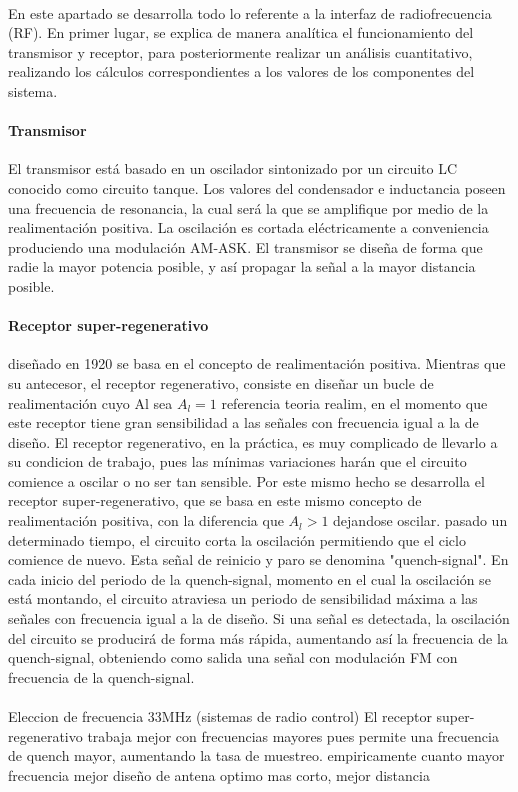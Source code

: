 \paragraph{} En este apartado se desarrolla todo lo referente a la interfaz de radiofrecuencia (RF). En primer lugar, se explica de manera analítica el funcionamiento del transmisor y receptor, para posteriormente realizar un análisis cuantitativo, realizando los cálculos correspondientes a los valores de los componentes del sistema.

\paragraph{Transmisor} El transmisor está basado en un oscilador sintonizado por un circuito LC conocido como circuito tanque. Los valores del condensador e inductancia poseen una frecuencia de resonancia, la cual será la que se amplifique por medio de la realimentación positiva. La oscilación es cortada eléctricamente a conveniencia produciendo una modulación AM-ASK. El transmisor se diseña de forma que radie la mayor potencia posible, y así propagar la señal a la mayor distancia posible.

\paragraph{Receptor super-regenerativo} diseñado en 1920 se basa en el concepto de realimentación positiva. Mientras que su antecesor, el receptor regenerativo, consiste en diseñar un bucle de realimentación cuyo Al sea $A_l = 1$ referencia teoria realim, en el momento que este receptor tiene gran sensibilidad a las señales con frecuencia igual a la de diseño. El receptor regenerativo, en la práctica, es muy complicado de llevarlo a su condicion de trabajo, pues las mínimas variaciones harán que el circuito comience a oscilar o no ser tan sensible. Por este mismo hecho se desarrolla el receptor super-regenerativo, que se basa en este mismo concepto de realimentación positiva, con la diferencia que $A_l > 1$ dejandose oscilar. pasado un determinado tiempo, el circuito corta la oscilación permitiendo que el ciclo comience de nuevo. Esta señal de reinicio y paro se denomina "quench-signal". En cada inicio del periodo de la quench-signal, momento en el cual la oscilación se está montando, el circuito atraviesa un periodo de sensibilidad máxima a las señales con frecuencia igual a la de diseño. Si una señal es detectada, la oscilación del circuito se producirá de forma más rápida, aumentando así la frecuencia de la quench-signal, obteniendo como salida una señal con modulación FM con frecuencia de la quench-signal.

\paragraph{} Eleccion de frecuencia 33MHz (sistemas de radio control) El receptor super-regenerativo trabaja mejor con frecuencias mayores pues permite una frecuencia de quench mayor, aumentando la tasa de muestreo. empiricamente cuanto mayor frecuencia mejor diseño de antena optimo mas corto, mejor distancia 
